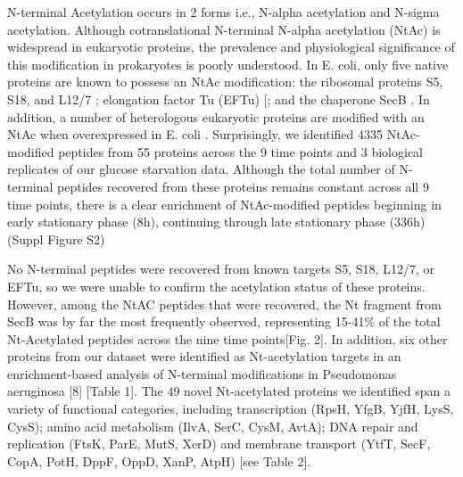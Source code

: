 \documentclass[12pt]{article}
\begin{document}
N-terminal Acetylation occurs in 2 forms i.e., N-{alpha} acetylation and N-{sigma} acetylation. Although cotranslational N-terminal N-{alpha} acetylation (NtAc) is widespread in eukaryotic proteins, the prevalence and physiological significance of this modification in prokaryotes is poorly understood. In E. coli, only five native proteins are known to possess an NtAc modification: the ribosomal proteins S5, S18, and L12/7 \cite{Nesterchuketal2011}; elongation factor Tu (EFTu) [\cite{Araietal1980}; and the chaperone SecB  \cite{Smithetal1996}. In addition, a number of heterologous eukaryotic proteins are modified with an NtAc when overexpressed in E. coli  \cite{Bernal-Perezetal2012}\cite{Charbautetal2002}\cite{Wuetal2006}\cite{Miaoetal2007}. Surprisingly, we identified 4335 NtAc-modified peptides from 55 proteins across the 9 time points and 3 biological replicates of our glucose starvation data. Although the total number of N-terminal peptides recovered from these proteins remains constant across all 9 time points, there is a clear enrichment of NtAc-modified peptides beginning in early stationary phase (8h), continuing through late stationary phase (336h) (Suppl Figure S2)

No N-terminal peptides were recovered from known targets S5, S18, L12/7, or EFTu, so we were unable to confirm the acetylation status of these proteins.  However, among the NtAC peptides that were recovered, the Nt fragment from SecB was by far the most frequently observed, representing 15-41\% of the total Nt-Acetylated peptides across the nine time points[Fig. 2]. In addition, six other proteins from our dataset were identified as Nt-acetylation targets in an enrichment-based analysis of N-terminal modifications in Pseudomonas aeruginosa [8] [Table 1]. The 49 novel Nt-acetylated proteins we identified span a variety of functional categories, including transcription (RpsH, YfgB, YjfH, LysS, CysS); amino acid metabolism (IlvA, SerC, CysM, AvtA); DNA repair and replication (FtsK, ParE, MutS, XerD) and membrane transport (YtfT, SecF, CopA, PotH, DppF, OppD, XanP, AtpH) [see Table 2]. 
\end{document}
